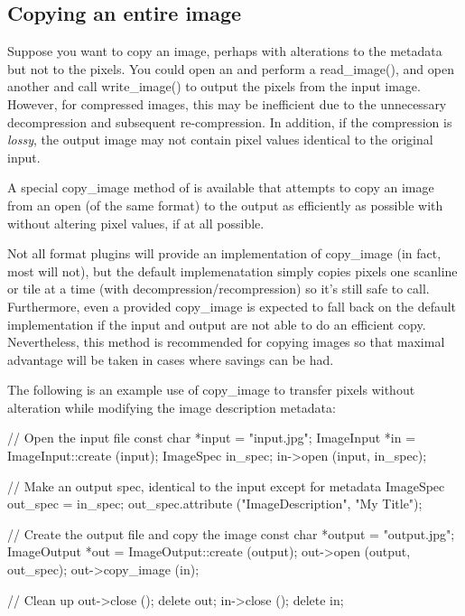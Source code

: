 \subsection{Copying an entire image}
\label{sec:imageoutput:copyimage}

Suppose you want to copy an image, perhaps with alterations to the 
metadata but not to the pixels.  You could open an \ImageInput and
perform a {\cf read_image()}, and open another \ImageOutput and
call {\cf write_image()} to output the pixels from the input image.
However, for compressed images, this may be inefficient due to the
unnecessary decompression and subsequent re-compression.  In addition,
if the compression is \emph{lossy}, the output image may not contain
pixel values identical to the original input.

A special {\cf copy_image} method of \ImageOutput is available that
attempts to copy an image from an open \ImageInput (of the same
format) to the output as efficiently as possible with without altering
pixel values, if at all possible.

Not all format plugins will provide an implementation of {\cf
  copy_image} (in fact, most will not), but the default implemenatation
simply copies pixels one scanline or tile at a time (with
decompression/recompression) so it's still safe to call.  Furthermore,
even a provided {\cf copy_image} is expected to fall back on the default
implementation if the input and output are not able to do an efficient
copy.  Nevertheless, this method is recommended
for copying images so that maximal advantage will be taken in cases
where savings can be had.

The following is an example use of {\cf copy_image} to transfer pixels
without alteration while modifying the image description metadata:

\begin{code}
    // Open the input file
    const char *input = "input.jpg";
    ImageInput *in = ImageInput::create (input);
    ImageSpec in_spec;
    in->open (input, in_spec);

    // Make an output spec, identical to the input except for metadata
    ImageSpec out_spec = in_spec;
    out_spec.attribute ("ImageDescription", "My Title");

    // Create the output file and copy the image
    const char *output = "output.jpg";
    ImageOutput *out = ImageOutput::create (output);
    out->open (output, out_spec);
    out->copy_image (in);

    // Clean up
    out->close ();
    delete out;
    in->close ();
    delete in;
\end{code}


